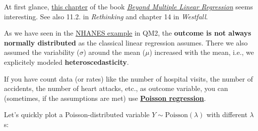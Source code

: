 \documentclass[
]{article}
\begin{document}
At first glance,
\href{https://bookdown.org/roback/bookdown-BeyondMLR/ch-poissonreg.html}{this
chapter} of the book
\href{https://bookdown.org/roback/bookdown-BeyondMLR/}{\emph{Beyond
Multiple Linear Regression}} seems interesting. See also 11.2. in
\emph{Rethinking} and chapter 14 in \emph{Westfall}.

As we have seen in the
\href{https://ec.europa.eu/info/funding-tenders/opportunities/portal/screen/opportunities/calls-for-proposals?isExactMatch=true&status=31094501,31094502,31094503&order=DESC&pageNumber=1&pageSize=50&sortBy=startDate}{NHANES
example} in QM2, the \textbf{outcome is not always normally distributed}
as the classical linear regression assumes. There we also assumed the
variability (\(\sigma\)) around the mean (\(\mu\)) increased with the
mean, i.e., we explicitely modeled \textbf{heteroscedasticity}.

If you have count data (or rates) like the number of hospital visits,
the number of accidents, the number of heart attacks, etc., as outcome
variable, you can (sometimes, if the assumptions are met) use
\href{https://en.wikipedia.org/wiki/Poisson_regression}{\textbf{Poisson
regression}}.

Let's quickly plot a Poisson-distributed variable
\(Y \sim \text{Poisson}(\lambda)\) with different \(\lambda\)s:
\end{document}
